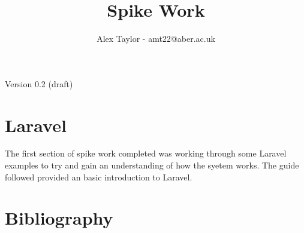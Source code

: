 \documentclass{article}
\title{Spike Work}
\author{Alex Taylor - amt22@aber.ac.uk}
\begin{document}
\maketitle
\begin{center}
	Version 0.2 (draft)
\end{center}
\tableofcontents
\thispagestyle{empty}
\newpage

\section{Laravel}
The first section of spike work completed was working through some Laravel examples to try and gain an understanding of how the syetem works. The guide\cite{Laravel5Guide} followed provided an basic introduction to Laravel.
\newpage

\section{Bibliography}


\end{document}
